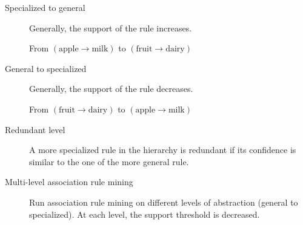 \begin{description}
    \item[Specialized to general]  
        Generally, the support of the rule increases.
        \begin{example}
            From $(\text{apple} \rightarrow \text{milk})$ to $(\text{fruit} \rightarrow \text{dairy})$
        \end{example}

    \item[General to specialized]  
        Generally, the support of the rule decreases.
        \begin{example}
            From $(\text{fruit} \rightarrow \text{dairy})$ to $(\text{apple} \rightarrow \text{milk})$
        \end{example}

    \item[Redundant level] 
        A more specialized rule in the hierarchy is redundant if its confidence is similar to the one of the more general rule.

    \item[Multi-level association rule mining] 
        Run association rule mining on different levels of abstraction (general to specialized).
        At each level, the support threshold is decreased.
\end{description}